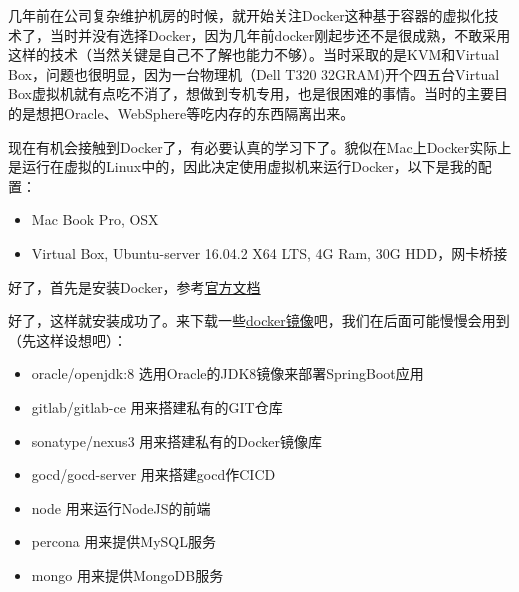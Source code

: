 \documentclass[12pt]{article}
\begin{document}
\makeblogtitle

几年前在公司复杂维护机房的时候，就开始关注Docker这种基于容器的虚拟化技术了，当时并没有选择Docker，因为几年前docker刚起步还不是很成熟，不敢采用这样的技术（当然关键是自己不了解也能力不够）。当时采取的是KVM和Virtual Box，问题也很明显，因为一台物理机（Dell T320 32GRAM)开个四五台Virtual Box虚拟机就有点吃不消了，想做到专机专用，也是很困难的事情。当时的主要目的是想把Oracle、WebSphere等吃内存的东西隔离出来。

现在有机会接触到Docker了，有必要认真的学习下了。貌似在Mac上Docker实际上是运行在虚拟的Linux中的，因此决定使用虚拟机来运行Docker，以下是我的配置：

\begin{itemize}
\tightlist
\item
  Mac Book Pro, OSX
\item
  Virtual Box, Ubuntu-server 16.04.2 X64 LTS, 4G Ram, 30G HDD，网卡桥接
\end{itemize}

好了，首先是安装Docker，参考\href{https://docs.docker.com/engine/installation/linux/ubuntu/\#install-docker}{官方文档}

\begin{Shaded}
\begin{Highlighting}[]
\DataTypeTok{\textbackslash{}}
\DataTypeTok{\textbackslash{}}
\DataTypeTok{\textbackslash{}}
\DataTypeTok{\textbackslash{}}
 \KeywordTok{|} \AttributeTok{{-}}
\DataTypeTok{\textbackslash{}}
   \DataTypeTok{\textbackslash{}}
\StringTok{   }\VariableTok{$(} \VariableTok{)}\StringTok{ }\DataTypeTok{\textbackslash{}}
\end{Highlighting}
\end{Shaded}

好了，这样就安装成功了。来下载一些\href{https://hub.docker.com/}{docker镜像}吧，我们在后面可能慢慢会用到（先这样设想吧）：

\begin{itemize}
\tightlist
\item
  oracle/openjdk:8 选用Oracle的JDK8镜像来部署SpringBoot应用
\item
  gitlab/gitlab-ce 用来搭建私有的GIT仓库
\item
  sonatype/nexus3 用来搭建私有的Docker镜像库
\item
  gocd/gocd-server 用来搭建gocd作CICD
\item
  node 用来运行NodeJS的前端
\item
  percona 用来提供MySQL服务
\item
  mongo 用来提供MongoDB服务
\end{itemize}
\end{document}
